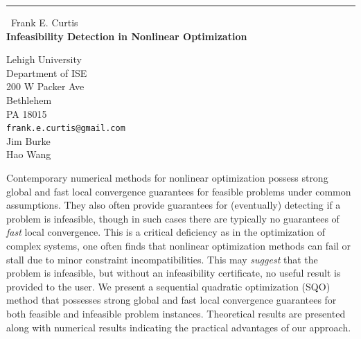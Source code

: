 \documentclass{report}
\begin{document}
\begin{center}
\rule{6in}{1pt} \
{\large Frank E. Curtis \\
{\bf Infeasibility Detection in Nonlinear Optimization}}

Lehigh University \\ Department of ISE \\ 200 W Packer Ave \\ Bethlehem \\ PA 18015
\\
{\tt frank.e.curtis@gmail.com}\\
Jim Burke\\
Hao Wang\end{center}

Contemporary numerical methods for nonlinear optimization possess strong
global and fast local convergence guarantees for feasible problems under
common assumptions. They also often provide guarantees for (eventually)
detecting if a problem is infeasible, though in such cases there are
typically no guarantees of \emph{fast} local convergence. This is a
critical deficiency as in the optimization of complex systems, one often
finds that nonlinear optimization methods can fail or stall due to minor
constraint incompatibilities. This may \emph{suggest} that the problem is
infeasible, but without an infeasibility certificate, no useful result is
provided to the user. We present a sequential quadratic optimization
(SQO) method that possesses strong global and fast local convergence
guarantees for both feasible and infeasible problem instances.
Theoretical results are presented along with numerical results indicating
the practical advantages of our approach.
\end{document}
